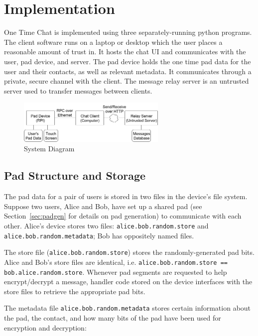 \documentclass[twocolumn]{article}
\begin{document}

\section{Implementation}
One Time Chat is implemented using three separately-running python programs.
The client software runs on a laptop or desktop which the user places a reasonable amount of trust in. It hosts the chat UI and communicates with the user, pad device, and server.
The pad device holds the one time pad data for the user and their contacts, as well as relevant metadata. It communicates through a private, secure channel with the client.
The message relay server is an untrusted server used to transfer messages between clients.

\begin{figure}[htp]
\centering
\includegraphics[width=2.8in]{system-diagram}
\caption{System Diagram}
\end{figure}

\subsection{Pad Structure and Storage}
The pad data for a pair of users is stored in two files in the device's file system. Suppose two users, Alice and Bob, have set up a shared pad (see Section~\ref{sec:padgen} for details on pad generation) to communicate with each other. Alice's device stores two files: \texttt{alice.bob.random.store} and \texttt{alice.bob.random.metadata}; Bob has oppositely named files.

The store file (\texttt{alice.bob.random.store}) stores the randomly-generated pad bits. Alice and Bob's store files are identical, i.e.
\texttt{alice.bob.random.store == bob.alice.random.store}. Whenever pad segments are requested to help encrypt/decrypt a message, handler code stored on the device interfaces with the store files to retrieve the appropriate pad bits.

The metadata file \texttt{alice.bob.random.metadata} stores certain information about the pad, the contact, and how many bits of the pad have been used for encryption and decryption:
\end{document}
